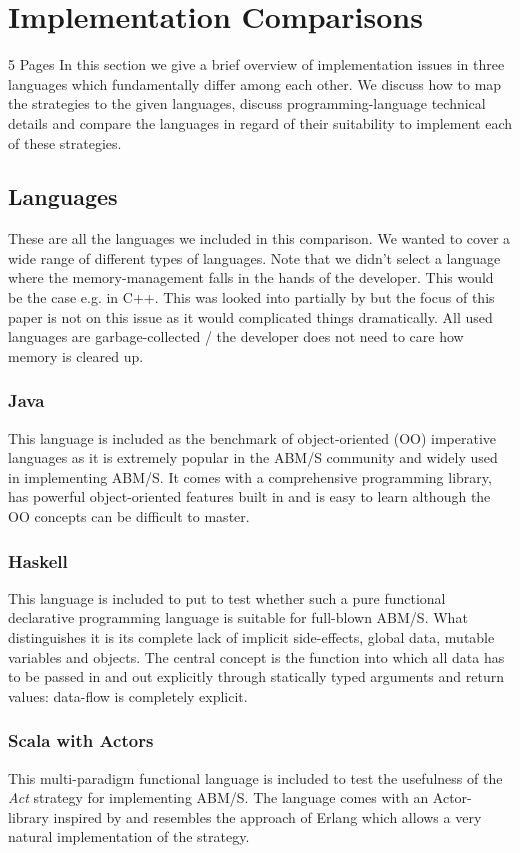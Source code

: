 \section{Implementation Comparisons}
5 Pages
In this section we give a brief overview of implementation issues in three languages which fundamentally differ among each other. We discuss how to map the strategies to the given languages, discuss programming-language technical details and compare the languages in regard of their suitability to implement each of these strategies. 

\subsection{Languages}
These are all the languages we included in this comparison. We wanted to cover a wide range of different types of languages. Note that we didn't select a language where the memory-management falls in the hands of the developer. This would be the case e.g. in C++. This was looked into partially by \cite{dawson_opening_2014} but the focus of this paper is not on this issue as it would complicated things dramatically. All used languages are garbage-collected / the developer does not need to care how memory is cleared up.

\subsubsection{Java}
This language is included as the benchmark of object-oriented (OO) imperative languages as it is extremely popular in the ABM/S community and widely used in implementing ABM/S. It comes with a comprehensive programming library, has powerful object-oriented features built in and is easy to learn although the OO concepts can be difficult to master.
	
\subsubsection{Haskell}
This language is included to put to test whether such a pure functional declarative programming language is suitable for full-blown ABM/S. What distinguishes it is its complete lack of implicit side-effects, global data, mutable variables and objects. The central concept is the function into which all data has to be passed in and out explicitly through statically typed arguments and return values: data-flow is completely explicit.

\subsubsection{Scala with Actors}
This multi-paradigm functional language is included to test the usefulness of the \textit{Act} strategy for implementing ABM/S. The language comes with an Actor-library inspired by \cite{agha_actors:_1986} and resembles the approach of Erlang which allows a very natural implementation of the strategy.




